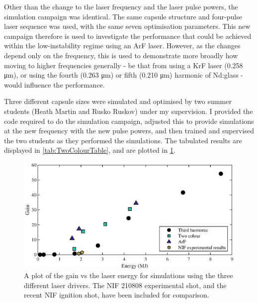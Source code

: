 Other than the change to the laser frequency and the laser pulse powers, the simulation campaign was identical. The same capsule structure and four-pulse laser sequence was used, with the same seven optimisation parameters. This new campaign therefore is used to investigate the performance that could be achieved within the low-instability regime using an ArF laser. However, as the changes depend only on the frequency, this is used to demonstrate more broadly how moving to higher frequencies generally - be that from using a KrF laser (0.258 \unit{\micro\meter}), or using the fourth (0.263 \unit{\micro\meter}) or fifth (0.210 \unit{\micro\meter}) harmonic of Nd:glass - would influence the performance.

Three different capsule sizes were simulated and optimised by two summer students (Heath Martin and Rusko Ruskov) under my supervision. I provided the code required to do the simulation campaign, adjusted this to provide simulations at the new frequency with the new pulse powers, and then trained and supervised the two students as they performed the simulations. The tabulated results are displayed in \ref{tab:TwoColourTable}, and are plotted in \ref{fig:ArF and Two colour}.

\begin{figure}[ht]
\centering
\includegraphics{figures/FurtherSims/ArFandTwoColour.eps}
\caption{A plot of the gain vs the laser energy for simulations using the three different laser drivers. The NIF 210808 experimental shot, and the recent NIF ignition shot, have been included for comparison.}
\label{fig:ArF and Two colour}
\end{figure}

